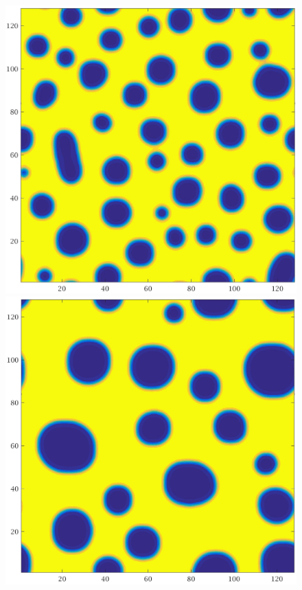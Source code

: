 \documentclass[a4paper,6pt]{article}
\begin{document}
\begin{figure}[H]
        \begin{minipage}[b]{.32\linewidth}        
                \centering
                \includegraphics[width=1\textwidth]{pics/C3_t4.jpg}
        \end{minipage}
        \begin{minipage}[b]{.32\linewidth}
                \centering
                \includegraphics[width=1\textwidth]{pics/C3_t5.jpg}

\end{minipage}
\end{figure}
\end{document}
